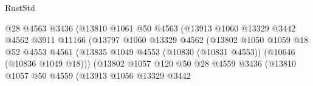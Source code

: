 \begin{lexlean}{RustStd}
\begin{coremodule}
                                            @28
                                            @4563
                                            @3436
                                            (@13810
                                              @1061
                                              @50
                                              @4563
                                              (@13913
                                                @1060
                                                @13329
                                                @3442
                                                @4562
                                                @3911
                                                @11166
                                                (@13797
                                                  @1060
                                                  @13329
                                                  @4562
                                                  (@13802
                                                    @1050
                                                    @1059
                                                    @18
                                                    @52
                                                    @4553
                                                    @4561
                                                    (@13835
                                                      @1049
                                                      @4553
                                                      (@10830 (@10831 @4553))
                                                      (@10646 (@10836 @1049 @18)))
                                                    (@13802
                                                      @1057
                                                      @120
                                                      @50
                                                      @28
                                                      @4559
                                                      @3436
                                                      (@13810
                                                        @1057
                                                        @50
                                                        @4559
                                                        (@13913
                                                          @1056
                                                          @13329
                                                          @3442

\end{coremodule}
\end{lexlean}
